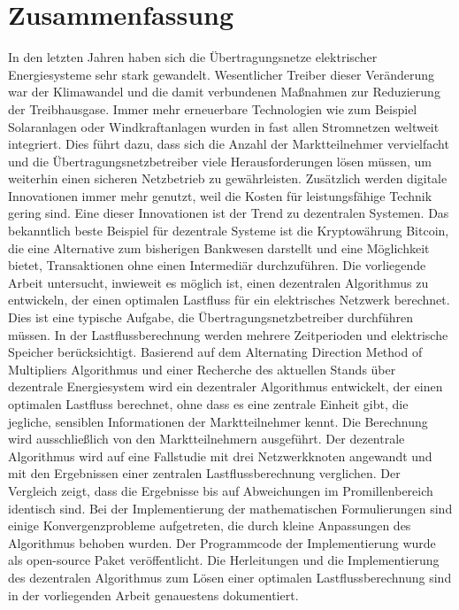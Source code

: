 \section*{Zusammenfassung}

In den letzten Jahren haben sich die Übertragungsnetze elektrischer Energiesysteme sehr stark gewandelt. Wesentlicher Treiber dieser Veränderung war der Klimawandel und die damit verbundenen Maßnahmen zur Reduzierung der Treibhausgase. Immer mehr erneuerbare Technologien wie zum Beispiel Solaranlagen oder Windkraftanlagen wurden in fast allen Stromnetzen weltweit integriert. Dies führt dazu, dass sich die Anzahl der Marktteilnehmer vervielfacht und die Übertragungsnetzbetreiber viele Herausforderungen lösen müssen, um weiterhin einen sicheren Netz\-betrieb zu gewährleisten. Zusätzlich werden digitale Innovationen immer mehr genutzt, weil die Kosten für leistungsfähige Technik gering sind. Eine dieser Innovationen ist der Trend zu dezentralen Systemen. Das bekanntlich beste Beispiel für dezentrale Systeme ist die Kryptowährung Bitcoin, die eine Alternative zum bisherigen Bankwesen darstellt und eine Möglichkeit bietet, Transaktionen ohne einen Intermediär durchzuführen. Die vorliegende Arbeit untersucht, inwieweit es möglich ist, einen dezentralen Algorithmus zu entwickeln, der einen optimalen Lastfluss für ein elektrisches Netzwerk berechnet. Dies ist eine typische Aufgabe, die Übertragungsnetzbetreiber durchführen müssen. In der Lastflussberechnung werden mehrere Zeitperioden und elektrische Speicher berücksichtigt. Basierend auf dem Alternating Direction Method of Multipliers Algorithmus und einer Recherche des aktuellen Stands über dezentrale Energiesystem wird ein dezentraler Algorithmus entwickelt, der einen optimalen Lastfluss berechnet, ohne dass es eine zentrale Einheit gibt, die jegliche, sensiblen Informationen der Marktteilnehmer kennt. Die Berechnung wird ausschließlich von den Marktteilnehmern ausgeführt. Der dezentrale Algorithmus wird auf eine Fallstudie mit drei Netzwerkknoten angewandt und mit den Ergebnissen einer zentralen Lastflussberechnung verglichen. Der Vergleich zeigt, dass die Ergebnisse bis auf Abweichungen im Promillenbereich identisch sind. Bei der Implementierung der mathematischen Formulierungen sind einige Konvergenzprobleme aufgetreten, die durch kleine Anpassungen des Algorithmus behoben wurden. Der Programmcode der Implementierung wurde als open-source Paket veröffentlicht. Die Herleitungen und die Implementierung des dezentralen Algorithmus zum Lösen einer optimalen Lastflussberechnung sind in der vorliegenden Arbeit genauestens dokumentiert.